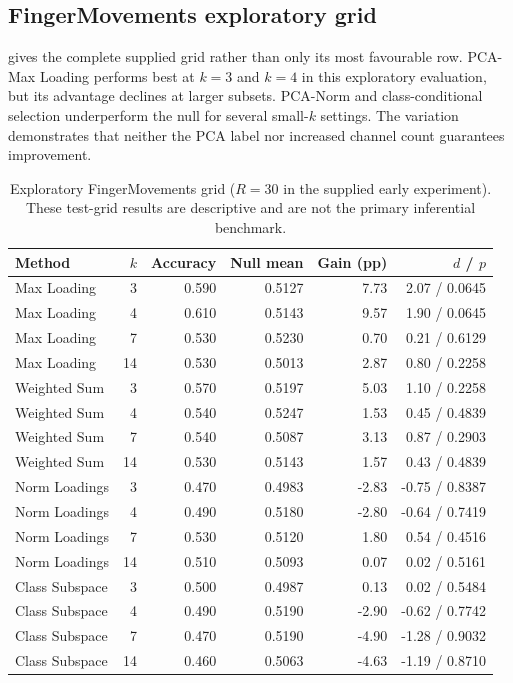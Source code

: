 \subsection{FingerMovements exploratory grid}
 gives the complete supplied grid rather than only its most favourable row. PCA-Max Loading performs best at $k=3$ and $k=4$ in this exploratory evaluation, but its advantage declines at larger subsets. PCA-Norm and class-conditional selection underperform the null for several small-$k$ settings. The variation demonstrates that neither the PCA label nor increased channel count guarantees improvement.

\begin{table}[H]
\centering
\caption{Exploratory FingerMovements grid ($R=30$ in the supplied early experiment). These test-grid results are descriptive and are not the primary inferential benchmark.}
\label{tab:finger-grid}
\scriptsize
\begin{tabular}{@{}lrrrrr@{}}
\toprule
Method & $k$ & Accuracy & Null mean & Gain (pp) & $d$ / $p$\\
\midrule
Max Loading & 3 & 0.590 & 0.5127 & 7.73 & 2.07 / 0.0645\\
Max Loading & 4 & 0.610 & 0.5143 & 9.57 & 1.90 / 0.0645\\
Max Loading & 7 & 0.530 & 0.5230 & 0.70 & 0.21 / 0.6129\\
Max Loading & 14 & 0.530 & 0.5013 & 2.87 & 0.80 / 0.2258\\
Weighted Sum & 3 & 0.570 & 0.5197 & 5.03 & 1.10 / 0.2258\\
Weighted Sum & 4 & 0.540 & 0.5247 & 1.53 & 0.45 / 0.4839\\
Weighted Sum & 7 & 0.540 & 0.5087 & 3.13 & 0.87 / 0.2903\\
Weighted Sum & 14 & 0.530 & 0.5143 & 1.57 & 0.43 / 0.4839\\
Norm Loadings & 3 & 0.470 & 0.4983 & -2.83 & -0.75 / 0.8387\\
Norm Loadings & 4 & 0.490 & 0.5180 & -2.80 & -0.64 / 0.7419\\
Norm Loadings & 7 & 0.530 & 0.5120 & 1.80 & 0.54 / 0.4516\\
Norm Loadings & 14 & 0.510 & 0.5093 & 0.07 & 0.02 / 0.5161\\
Class Subspace & 3 & 0.500 & 0.4987 & 0.13 & 0.02 / 0.5484\\
Class Subspace & 4 & 0.490 & 0.5190 & -2.90 & -0.62 / 0.7742\\
Class Subspace & 7 & 0.470 & 0.5190 & -4.90 & -1.28 / 0.9032\\
Class Subspace & 14 & 0.460 & 0.5063 & -4.63 & -1.19 / 0.8710\\
\bottomrule
\end{tabular}
\end{table}

